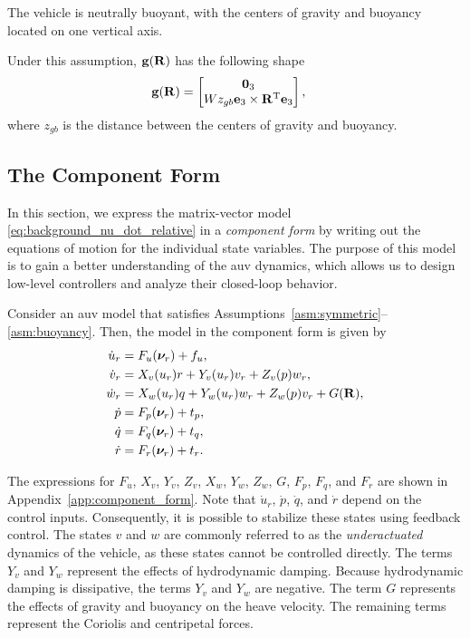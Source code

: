 \begin{asm}
    \label{asm:buoyancy}
    The vehicle is neutrally buoyant, with the centers of gravity and buoyancy located on one vertical axis.
\end{asm}
\noindent Under this assumption, $\mathbf{g}(\mathbf{R})$ has the following shape
\begin{align}
    \mathbf{g}(\mathbf{R}) &= \begin{bmatrix}
        \mathbf{0}_3 \\ Wz_{gb} \mathbf{e}_3 \times \mathbf{R}^{\mathrm{T}} \mathbf{e}_3
    \end{bmatrix},
    \label{eq:gravity}
\end{align}
where $z_{gb}$ is the distance between the centers of gravity and buoyancy.

\subsection{The Component Form}
\label{sec:model_component}
In this section, we express the matrix-vector model \eqref{eq:background_nu_dot_relative} in a \emph{component form} by writing out the equations of motion for the individual state variables.
The purpose of this model is to gain a better understanding of the \gls{auv} dynamics, which allows us to design low-level controllers and analyze their closed-loop behavior.

Consider an \gls{auv} model that satisfies Assumptions~\ref{asm:symmetric}--\ref{asm:buoyancy}.
Then, the model in the component form is given by
\begin{subequations}
    \begin{align}
        \dot{u}_r &= F_u(\bm{\nu}_r) + f_u, \label{eq:background_component_form_u_dot} \\
        \dot{v}_r &= X_v(u_r)r + Y_v(u_r)v_r + Z_v(p)w_r, \\
        \dot{w}_r &= X_w(u_r)q + Y_w(u_r)w_r + Z_w(p)v_r + G(\mathbf{R}), \\
        \dot{p} &= F_p(\bm{\nu}_r) + t_p, \\
        \dot{q} &= F_q(\bm{\nu}_r) + t_q, \\
        \dot{r} &= F_r(\bm{\nu}_r) + t_r.
    \end{align}
    \label{eq:background_component_form}
\end{subequations}

The expressions for $F_u$, $X_v$, $Y_v$, $Z_v$, $X_w$, $Y_w$, $Z_w$, $G$, $F_p$, $F_q$, and $F_r$ are shown in Appendix~\ref{app:component_form}.
Note that $\dot{u}_r$, $\dot{p}$, $\dot{q}$, and $\dot{r}$ depend on the control inputs.
Consequently, it is possible to stabilize these states using feedback control.
The states $v$ and $w$ are commonly referred to as the \emph{underactuated} dynamics of the vehicle, as these states cannot be controlled directly.
The terms $Y_v$ and $Y_w$ represent the effects of hydrodynamic damping.
Because hydrodynamic damping is dissipative, the terms $Y_v$ and $Y_w$ are negative.
The term $G$ represents the effects of gravity and buoyancy on the heave velocity.
The remaining terms represent the Coriolis and centripetal forces.

